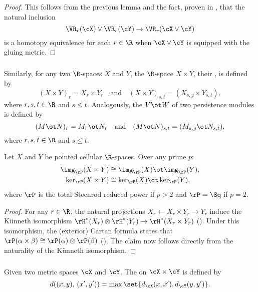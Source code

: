 \begin{proof}
	This follows from the previous lemma and the fact, proven in \cite[Prop.~1]{adamaszek2020homotopy}, that the natural inclusion
	\[
	\VR_r(\cX) \vee \VR_r(\cY) \to \VR_r(\cX \vee \cY)
	\]
	is a homotopy equivalence for each $r \in \R$ when \(\cX \vee \cY\) is equipped with the gluing metric.
\end{proof}

\subsubsection{}\label{ss:product_general}

Similarly, for any two $\R$-spaces $X$ and $Y$, the $\R$-space $X \times Y$, their , is defined by
\[
(X \times Y)_r = X_r \times Y_r \quad\text{and}\quad (X \times Y)_{s,t} = (X_{s,y} \times Y_{s,t}),
\]
where \(r, s, t \in \R\) and \(s \leq t\).
Analogously, the  \(V \ot W\) of two persistence modules is defined by
\[
(M \ot N)_r = M_r \ot N_r \quad\text{and}\quad (M \ot N)_{s,t} = (M_{s,y} \ot N_{s,t}),
\]
where \(r, s, t \in \R\) and \(s \leq t\).

\lemma
Let $X$ and $Y$ be pointed cellular $\R$-spaces.
Over any prime \(p\):
\begin{align*}
	\img_\rP(X \times Y) &\cong \img_\rP(X) \ot \img_\rP(Y),\\
	\ker_\rP(X \times Y) &\cong \ker_\rP(X) \ot \ker_\rP(Y),
\end{align*}
where \(\rP\) is the total Steenrod reduced power if \(p > 2\) and \(\rP = \Sq\) if \(p = 2\).

\begin{proof}
	For any \(r \in \R\), the natural projections $X_r \leftarrow X_r \times Y_r \to Y_r$ induce the K\"unneth isomorphism $\rH^*(X_r) \otimes \rH^*(Y_r) \to \rH^*(X_r \times Y_r)$ (\cite[Cor.~3B.7.]{hatcher2000}).
	Under this isomorphism, the (exterior) Cartan formula states that \(\rP(\alpha \times \beta) \cong \rP(\alpha) \otimes \rP(\beta)\) (\cite[Cor.~2.7]{may1970general}).
	The claim now follows directly from the naturality of the K\"unneth isomorphism.
\end{proof}

\subsubsection{}\label{ss:products}

Given two metric spaces $\cX$ and $\cY$.
The  on $\cX \times \cY$ is defined by
\[
d((x,y), \, (x',y')) = \max\set{d_{\cX}(x,x'), d_{\cY}(y,y')}.
\]

